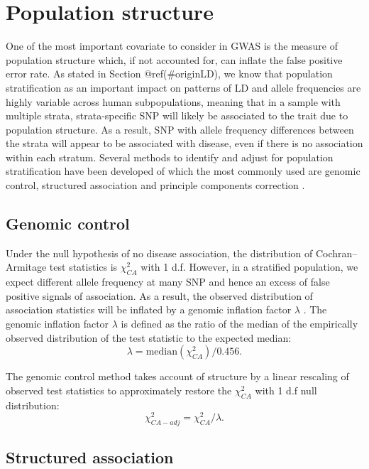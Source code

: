 \documentclass[]{book}
\begin{document}
\hypertarget{popstructure}{%
\section{Population structure}\label{popstructure}}

One of the most important covariate to consider in GWAS is the measure
of population structure which, if not accounted for, can inflate the
false positive error rate. As stated in Section @ref(\#originLD), we
know that population stratification as an important impact on patterns
of LD and allele frequencies are highly variable across human
subpopulations, meaning that in a sample with multiple strata,
strata-specific SNP will likely be associated to the trait due to
population structure. As a result, SNP with allele frequency differences
between the strata will appear to be associated with disease, even if
there is no association within each stratum. Several methods to identify
and adjust for population stratification have been developed of which
the most commonly used are genomic control, structured association and
principle components correction \citep{balding2008handbook}.

\hypertarget{genomic-control}{%
\subsection{Genomic control}\label{genomic-control}}

Under the null hypothesis of no disease association, the distribution of
Cochran--Armitage test statistics is \(\chi_{CA}^2\) with 1 d.f. However,
in a stratified population, we expect different allele frequency at many
SNP and hence an excess of false positive signals of association. As a
result, the observed distribution of association statistics will be
inflated by a genomic inflation factor \(\lambda\) \citep{devlin1999genomic}.
The genomic inflation factor \(\lambda\) is defined as the ratio of the
median of the empirically observed distribution of the test statistic to
the expected median: \[\lambda=\text{median}(\chi_{CA}^2)/0.456.\]

The genomic control method takes account of structure by a linear
rescaling of observed test statistics to approximately restore the
\(\chi_{CA}^2\) with 1 d.f null distribution:
\[\chi^2_{CA-adj}=\chi_{CA}^2/\lambda.\]

\hypertarget{structured-association}{%
\subsection{Structured association}\label{structured-association}}
\end{document}
